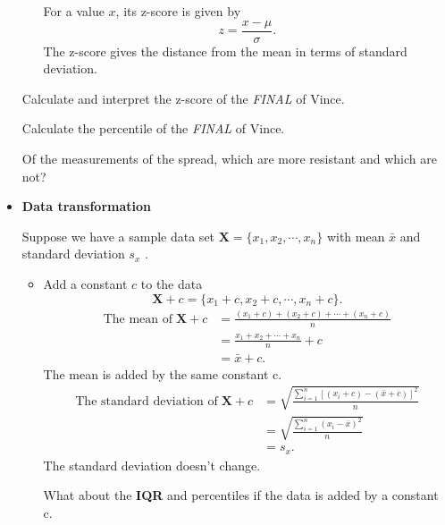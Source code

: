 \documentclass[a4paper, 12pt,twoside]{book}
\begin{document}
\begin{itemize}
\begin{itemize}
For a value $x$, its z-score is given by $$z=\frac{x-\mu}{\sigma}.$$
\colorbox{babypink}{The z-score  gives the distance from the mean in terms of standard deviation.}

\end{itemize}

\colorbox{dollarbill}{Calculate and interpret the z-score of the \textit{FINAL} of Vince.}

\colorbox{dollarbill}{Calculate the percentile of the \textit{FINAL} of Vince.}

\colorbox{dollarbill}{Of the measurements of the spread, which are more resistant and which are not?}

\item \textbf{Data transformation}

Suppose we have a sample data set $\mathbf{X} = \{x_1, x_2, \cdots, x_n\}$ with mean $\bar{x}$ and standard deviation $s_x$ . 

\begin{itemize}
\item Add a constant $c$ to the data
$$\mathbf{X}+c = \{x_1+c, x_2+c, \cdots, x_n+c\}.$$
\begin{equation*}
\begin{split}
\text{The mean of}\;\mathbf{X}+c &= \frac{(x_1+c)+(x_2+c)+\cdots+(x_n+c)}{n}\\
&= \frac{x_1+x_2+\cdots+x_n}{n}+ c\\
&= \bar{x} + c.
\end{split}
\end{equation*}
\colorbox{babypink}{The mean is added by the same constant c.}
\begin{equation*}
\begin{split}
\text{The standard deviation of}\;\mathbf{X}+c &= \sqrt{\frac{\sum_{i=1}^n[(x_i+c)-(\bar{x}+c)]^2}{n}}\\
&= \sqrt{\frac{\sum_{i=1}^n(x_i-\bar{x})^2}{n}}\\
&= s_x.
\end{split}
\end{equation*}
\colorbox{babypink}{The standard deviation doesn't change.}

\colorbox{dollarbill}{What about the \textbf{IQR} and percentiles if the data is added by a constant c.}


\end{itemize}
\end{itemize}
\end{document}
